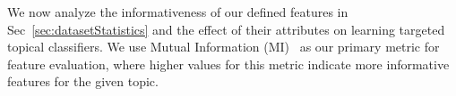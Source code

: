 We now analyze the informativeness of our defined
features in Sec~\ref{sec:datasetStatistics} and the effect of their
attributes on learning targeted topical classifiers. 
We use Mutual Information (MI)~\cite{manning_ir} as our primary
metric for feature evaluation,   
where higher values for this metric indicate more informative features for the given topic.

